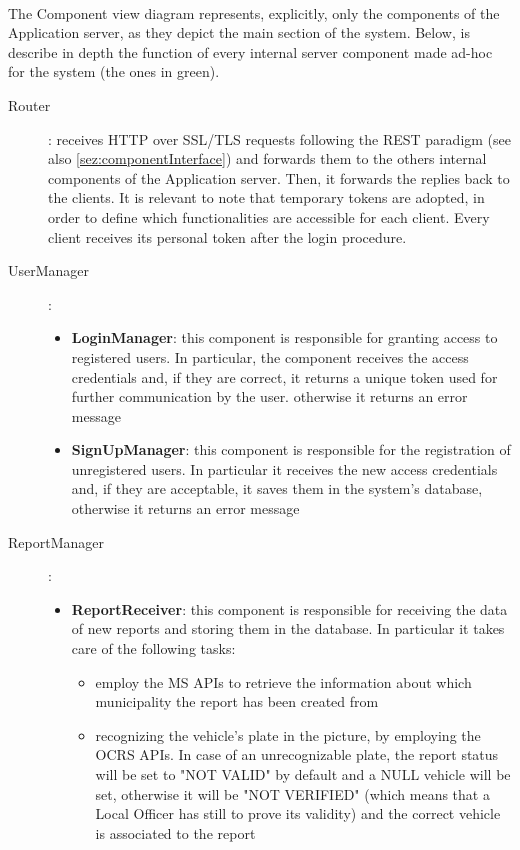			\paragraph{}
				The Component view diagram represents, explicitly, only the components of the Application server, as they depict the main section of the system. 
				Below, is describe in depth the function of every internal server component made ad-hoc for the system (the ones in green).
			\begin{description}
				\item[Router]: receives HTTP over SSL/TLS requests following the REST paradigm (see also \ref{sez:componentInterface}) and forwards them to the others internal components of the Application server. Then, it forwards the replies back to the clients. It is relevant to note that temporary tokens are adopted, in order to define which functionalities are accessible for each client. Every client receives its personal token after the login procedure. 
				\item[UserManager]: 
					\begin{itemize}
						\item \textbf{LoginManager}: this component is responsible for granting access to registered users. In particular, the component receives the access credentials and, if they are correct, it returns a unique token used for further communication by the user. otherwise it returns an error message
						\item \textbf{SignUpManager}:  this component is responsible for the registration of unregistered users. In particular it receives the new access credentials and, if they are acceptable, it saves them in the system's database, otherwise it returns an error message
					\end{itemize}
				\item[ReportManager]: 
					\begin{itemize}
						\item \textbf{ReportReceiver}: this component is responsible for receiving the data of new reports and storing them in the database. In particular it takes care of the following tasks:
							\begin{itemize}
								\item employ the MS APIs to retrieve the information about which municipality the report has been created from
								\item recognizing the vehicle's plate in the picture, by employing the OCRS APIs. In case of an unrecognizable plate, the report status will be set to "NOT VALID" by default and a NULL vehicle will be set, otherwise it will be "NOT VERIFIED" (which means that a Local Officer has still to prove its validity) and the correct vehicle is associated to the report

\end{itemize}
\end{itemize}
\end{description}
